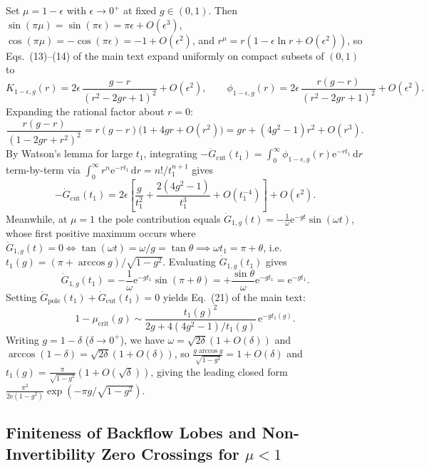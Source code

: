 \documentclass[onecolumn,10pt,notitlepage,amsmath,amssymb,floatfix]{revtex4-2}
\theoremstyle{plain}
\theoremstyle{definition}
\newcommand{\dd}{\mathrm{d}}
\newcommand{\ee}{\mathrm{e}}
\newcommand{\mucrit}{\mu_{\mathrm{crit}}}
\begin{document}
Set $\mu = 1 - \epsilon$ with $\epsilon \to 0^+$ at fixed $g \in (0,1)$. Then $\sin(\pi\mu) = \sin(\pi\epsilon) = \pi\epsilon + O(\epsilon^3)$, $\cos(\pi\mu) = -\cos(\pi\epsilon) = -1 + O(\epsilon^2)$, and $r^\mu = r(1 - \epsilon\ln r + O(\epsilon^2))$, so Eqs.~(13)--(14) of the main text expand uniformly on compact subsets of $(0,1)$ to
\begin{equation}
\label{eq:S3_K_eps}
K_{1-\epsilon,g}(r) = 2\epsilon\,\frac{g - r}{(r^2 - 2gr + 1)^2} + O(\epsilon^2), \qquad
\phi_{1-\epsilon,g}(r) = 2\epsilon\,\frac{r(g - r)}{(r^2 - 2gr + 1)^2} + O(\epsilon^2).
\end{equation}
Expanding the rational factor about $r = 0$:
\[
\frac{r(g-r)}{(1 - 2gr + r^2)^2}
= r(g-r)\big(1 + 4gr + O(r^2)\big)
= g r + (4g^2 - 1)r^2 + O(r^3).
\]
By Watson's lemma for large $t_1$, integrating $-\dot{G}_{\mathrm{cut}}(t_1) = \int_0^\infty \phi_{1-\epsilon,g}(r)\ee^{-r t_1}\,\dd r$ term-by-term via $\int_0^\infty r^n \ee^{-r t_1}\,\dd r = n!/t_1^{n+1}$ gives
\begin{equation}
\label{eq:S3_watson2}
-\dot{G}_{\mathrm{cut}}(t_1) = 2\epsilon\left[\frac{g}{t_1^2} + \frac{2(4g^2 - 1)}{t_1^3} + O(t_1^{-4})\right] + O(\epsilon^2).
\end{equation}
Meanwhile, at $\mu = 1$ the pole contribution equals $\dot{G}_{1,g}(t) = -\frac{1}{\omega}\ee^{-gt}\sin(\omega t)$, whose first positive maximum occurs where $\ddot{G}_{1,g}(t) = 0 \iff \tan(\omega t) = \omega/g = \tan\theta \implies \omega t_1 = \pi + \theta$, i.e. $t_1(g) = (\pi + \arccos g)/\sqrt{1-g^2}$. Evaluating $\dot{G}_{1,g}(t_1)$ gives
\[
\dot{G}_{1,g}(t_1) = -\frac{1}{\omega}\ee^{-g t_1}\sin(\pi+\theta) = +\frac{\sin\theta}{\omega}\ee^{-g t_1} = \ee^{-g t_1}.
\]
Setting $\dot{G}_{\mathrm{pole}}(t_1) + \dot{G}_{\mathrm{cut}}(t_1) = 0$ yields Eq.~(21) of the main text:
\begin{equation}
\label{eq:S3_asymp_full}
1 - \mucrit(g) \sim \frac{t_1(g)^2}{2g + 4(4g^2-1)/t_1(g)}\,\ee^{-g t_1(g)}.
\end{equation}
Writing $g = 1 - \delta$ ($\delta \to 0^+$), we have $\omega = \sqrt{2\delta}(1 + O(\delta))$ and $\arccos(1-\delta) = \sqrt{2\delta}(1 + O(\delta))$, so $\frac{g\arccos g}{\sqrt{1-g^2}} = 1 + O(\delta)$ and $t_1(g) = \frac{\pi}{\sqrt{1-g^2}}(1 + O(\sqrt{\delta}))$, giving the leading closed form $\frac{\pi^2}{2\ee(1-g^2)}\exp(-\pi g/\sqrt{1-g^2})$.

\subsection{Finiteness of Backflow Lobes and Non-Invertibility Zero Crossings for \texorpdfstring{$\mu < 1$}{mu < 1}}
\end{document}
